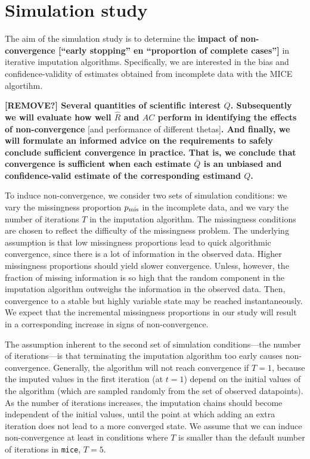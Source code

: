 \documentclass[Royal,times,sageh]{sagej}
\begin{document}
\hypertarget{simulation-study}{%
\section{Simulation study}\label{simulation-study}}

The aim of the simulation study is to determine the \textbf{impact of non-convergence {[}``early stopping'' en ``proportion of complete cases''{]}} in iterative imputation algorithms. Specifically, we are interested in the bias and confidence-validity of estimates obtained from incomplete data with the MICE algortihm.

\textbf{{[}REMOVE?{]} Several quantities of scientific interest \(Q\). Subsequently we will evaluate how well \(\widehat{R}\) and \(AC\) perform in identifying the effects of non-convergence }{[}and performance of different thetas{]}\textbf{. And finally, we will formulate an informed advice on the requirements to safely conclude sufficient convergence in practice. That is, we conclude that convergence is sufficient when each estimate \(\bar{Q}\) is an unbiased and confidence-valid estimate of the corresponding estimand \(Q\).}

To induce non-convergence, we consider two sets of simulation conditions: we vary the missingness proportion \(p_{\rm mis}\) in the incomplete data, and we vary the number of iterations \(T\) in the imputation algorithm. The missingness conditions are chosen to reflect the difficulty of the missingness problem. The underlying assumption is that low missingness proportions lead to quick algorithmic convergence, since there is a lot of information in the observed data. Higher missingness proportions should yield slower convergence. Unless, however, the fraction of missing information is so high that the random component in the imputation algorithm outweighs the information in the observed data. Then, convergence to a stable but highly variable state may be reached instantaneously. We expect that the incremental missingness proportions in our study will result in a corresponding increase in signs of non-convergence.

The assumption inherent to the second set of simulation conditions---the number of iterations---is that terminating the imputation algorithm too early causes non-convergence. Generally, the algorithm will not reach convergence if \(T=1\), because the imputed values in the first iteration (at \(t=1\)) depend on the initial values of the algorithm (which are sampled randomly from the set of observed datapoints). As the number of iterations increases, the imputation chains should become independent of the initial values, until the point at which adding an extra iteration does not lead to a more converged state. We assume that we can induce non-convergence at least in conditions where \(T\) is smaller than the default number of iterations in \texttt{mice}, \(T=5\).
\end{document}
